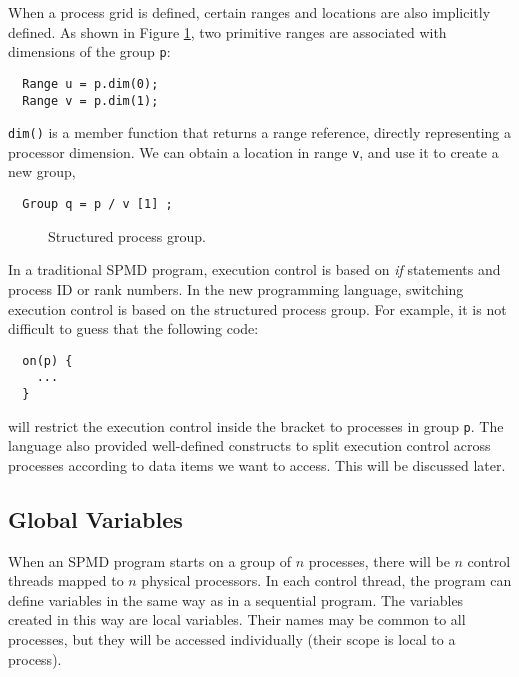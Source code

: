 When a process grid is defined, certain ranges and locations are
also implicitly defined.  As shown in Figure \ref{fig:group},
two primitive ranges are associated with dimensions of the group
\texttt{p}:
\small
\begin{verbatim}
  Range u = p.dim(0);  
  Range v = p.dim(1);
\end{verbatim}
\normalsize
\texttt{dim()} is a member function that returns a range reference,
directly representing a processor dimension.
We can obtain a location in range \texttt{v}, and use it
to create a new group,
\small
\begin{verbatim}
  Group q = p / v [1] ;
\end{verbatim}
\normalsize
\begin{figure}[tbp]
  \begin{center}
    \leavevmode
    \caption{Structured process group.}
    \label{fig:group}
  \end{center}
\end{figure}

In a traditional SPMD program, execution control is based on
{\em if} statements and process ID or rank numbers. In the new
programming language, switching execution control is based on the
structured process group.  For example, it is not difficult to guess
that the following code:
\small
\begin{verbatim}
  on(p) {
    ...
  }
\end{verbatim}
\normalsize
will restrict the execution control inside the bracket to processes in
group \texttt{p}.
The language also provided well-defined constructs to split
execution control across processes according to data items we want to
access.  This will be discussed later.

\subsection{Global Variables}

When an SPMD program starts on a group of $n$ processes, there will be
$n$ control threads mapped to $n$ physical processors.
In each control thread, the program can define variables in the same
way as in a sequential program.  The variables created in this way are
local variables.  Their names may be common to all
processes, but they will be accessed individually (their scope is
local to a process).

